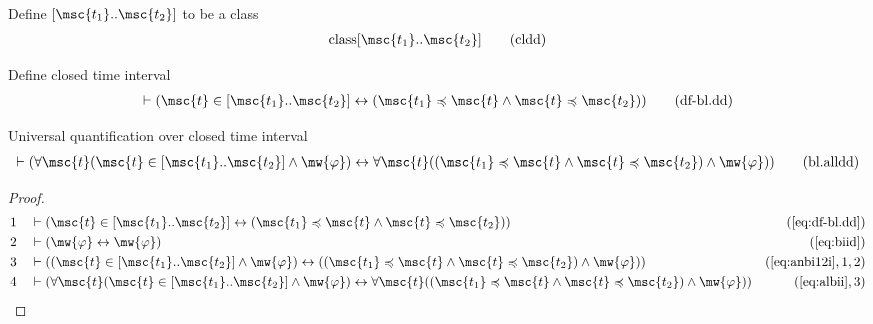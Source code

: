\begin{metadefinition} Define $[ \msc{t_1}  ..  \msc{t_2} ]$ to be
a class
\begin{align}
{\rm class} [ \msc{t_1} .. \msc{t_2} ]\label{eq:cldd}\tag{cldd}
\end{align}
\end{metadefinition}

\begin{metadefinition} Define closed time interval
\begin{align}
\vdash ( \msc{t} \in [ \msc{t_1} .. \msc{t_2} ] \leftrightarrow ( \msc{t_1}
    \preccurlyeq \msc{t} \wedge \msc{t} \preccurlyeq \msc{t_2} )
    )\label{eq:df-bl.dd}\tag{df-bl.dd}
\end{align}
\end{metadefinition}

\begin{lemma} Universal quantification over closed time
interval
\begin{align}
\vdash ( \forall \msc{t} ( \msc{t} \in [ \msc{t_1} .. \msc{t_2} ] \wedge
    \mw{\varphi} ) \leftrightarrow \forall \msc{t} ( ( \msc{t_1} \preccurlyeq
    \msc{t} \wedge \msc{t} \preccurlyeq \msc{t_2} ) \wedge \mw{\varphi} )
    )\label{eq:bl.alldd}\tag{bl.alldd}
\end{align}
\end{lemma}

\begin{proof}
\begin{align}
  1 &&  & \vdash ( \msc{t} \in [ \msc{t_1} .. \msc{t_2} ] \leftrightarrow ( \msc{t_1} \preccurlyeq \msc{t} \wedge \msc{t} \preccurlyeq \msc{t_2} ) )&(\mbox{\ref{eq:df-bl.dd}})\notag
  \\ 2 &&  & \vdash ( \mw{\varphi} \leftrightarrow \mw{\varphi} )&(\mbox{\ref{eq:biid}})\notag
  \\ 3 &&  & \vdash ( ( \msc{t} \in [ \msc{t_1} .. \msc{t_2} ] \wedge \mw{\varphi} ) \leftrightarrow ( ( \msc{t_1} \preccurlyeq \msc{t} \wedge \msc{t} \preccurlyeq \msc{t_2} ) \wedge \mw{\varphi} ) )&(\mbox{\ref{eq:anbi12i}},1,2)\notag
  \\ 4 &&  & \vdash ( \forall \msc{t} ( \msc{t} \in [ \msc{t_1} .. \msc{t_2} ] \wedge \mw{\varphi} ) \leftrightarrow \forall \msc{t} ( ( \msc{t_1} \preccurlyeq \msc{t} \wedge \msc{t} \preccurlyeq \msc{t_2} ) \wedge \mw{\varphi} ) )&(\mbox{\ref{eq:albii}},3)\notag
\end{align}
\end{proof}

